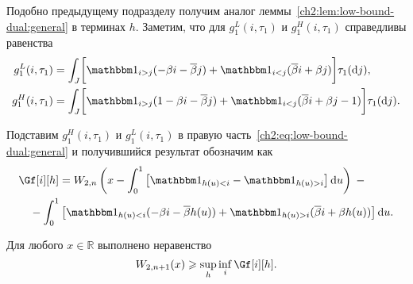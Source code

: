 {Подобно предыдущему подразделу получим аналог леммы~\ref{ch2:lem:low-bound-dual:general} в терминах $h$.
Заметим, что для $g_1^L(i, \tau_1)$ и $g_1^H(i, \tau_1)$ справедливы равенства
\begin{align*}
  g_1^L(i,\tau_1) &=
                      \int_J \biggl[
                      \Ind{i>j} (-\Co i - \DCo j) +
                      \Ind{i<j} (\DCo i + \Co j)
                      \biggr] \tau_1(\di j),\\
  g_1^H(i,\tau_1) &=
                      \int_J \biggl[
                      \Ind{i>j} (1 -\Co i - \DCo j) +
                      \Ind{i<j} (\DCo i + \Co j - 1)
                      \biggr] \tau_1(\di j).
\end{align*}

Подставим $g_1^H(i, \tau_1)$ и $g_1^L(i,\tau_1)$ в правую часть~\eqref{ch2:eq:low-bound-dual:general} и получившийся результат обозначим как
\begin{equation}\label{eq:W-low-bound:parameterized}
\begin{multlined}
  \Gf[i][h] =
  W_{2,n}\left( 
    x - \int_0^1 \left[ \Ind{h(u) < i} - \Ind{h(u) > i} \right] \di u
  \right) \; - \\
  - \int_0^1 \left[ 
    \Ind{h(u) < i} (-\Co i - \DCo h(u)) + 
    \Ind{h(u) > i} (\DCo i + \Co h(u)) 
  \right] \di u.
\end{multlined}
\end{equation}

\begin{lemma}\label{ch2:lem:W-low-bound:parameterized}
  Для любого $x \in \mathbb{R}$ выполнено неравенство
  \begin{equation*}
    W_{2,n+1}(x) \geqslant \sup_h \inf_{i} \Gf[i][h].
  \end{equation*}
\end{lemma}

}

